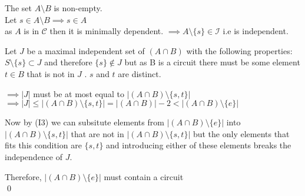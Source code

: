 \documentclass{article}
\theoremstyle{plain}
\theoremstyle{definition}
\theoremstyle{remark}
\begin{document}
 \vspace{2mm}
 
\noindent The set $ A \setminus B $ is non-empty.\\
 Let $ s \in A \setminus B    \implies s \in A$\\
 \noindent as $A$ is in $\mathcal{C}$ then it is minimally dependent.
 \noindent $\implies A \setminus \{s\} \in \mathcal{I}$ i.e is independent.
 
 \vspace{2mm}
 
\noindent Let $J$ be a maximal independent set of $(A \cap B)$ with the following properties: $S \setminus \{s\} \subset J $ and therefore $ \{s\} \notin J $ but as B is a circuit there must be some element $t \in B$ that is not in $J$ . $s$ and $t$ are distinct.
 
 \vspace{2mm}
 
\noindent $\implies |J| $ must be at most equal to $|(A \cap B) \setminus \{s,t\}| $\\
 $\implies |J| \leq |(A \cap B) \setminus \{s,t\}| = |(A \cap B)| - 2 < |(A \cap B) \setminus \{e\}|$
 
 \vspace{2mm} 
 
 \noindent Now by (I3) we can subsitute elements from $|(A \cap B) \setminus \{e\}|$ into $|(A \cap B) \setminus \{s,t\}|$ that are not in $|(A \cap B) \setminus \{s,t\}|$ but the only elements that fits this condition are $\{s,t\}$ and introducing either of these elements breaks the independence of $J$.
 
\noindent Therefore, $|(A \cap B) \setminus \{e\}|$ must contain a circuit\\
 \qed
 
\end{document}
